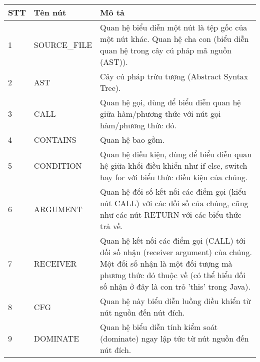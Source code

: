 \footnotesize
\begin{longtable}{| p{} | p{} | p{} |}
\hline
\textbf{STT} & \textbf{Tên nút} & \textbf{Mô tả} \\ \hline
1  & SOURCE\_FILE    & Quan hệ biểu diễn một nút là tệp gốc của một nút khác. Quan hệ cha con (biểu diễn quan hệ trong cây cú pháp mã nguồn (AST)).                                                                                 \\ \hline
2  & AST            & Cây cú pháp trừu tượng (Abstract Syntax Tree).                                                                                                                                                               \\ \hline
3  & CALL           & Quan hệ gọi, dùng để biểu diễn quan hệ giữa hàm/phương thức với nút gọi hàm/phương thức đó.                                                                                                                  \\ \hline
4  & CONTAINS       & Quan hệ bao gồm.                                                                                                                                                                                             \\ \hline
5  & CONDITION      & Quan hệ điều kiện, dùng để biểu diễn quan hệ giữa khối điều khiển như if else, switch hay for với biểu thức điều kiện của chúng.                                                                             \\ \hline
6  & ARGUMENT       & Quan hệ đối số kết nối các điểm gọi (kiểu nút CALL) với các đối số của chúng, cũng như các nút RETURN với các biểu thức trả về.                                                                              \\ \hline
7  & RECEIVER       & Quan hệ kết nối các điểm gọi (CALL) tới đối số nhận (receiver argument) của chúng. Một đối số nhận là một đối tượng mà phương thức đó thuộc về (có thể hiểu đối số nhận ở đây là con trỏ 'this' trong Java). \\ \hline
8  & CFG            & Quan hệ này biểu diễn luồng điều khiển từ nút nguồn đến nút đích.                                                                                                                                            \\ \hline
9  & DOMINATE       & Quan hệ biểu diễn tính kiểm soát (dominate) ngay lập tức từ nút nguồn đến nút đích.                                                                                                                          \\ \hline

\end{longtable}
